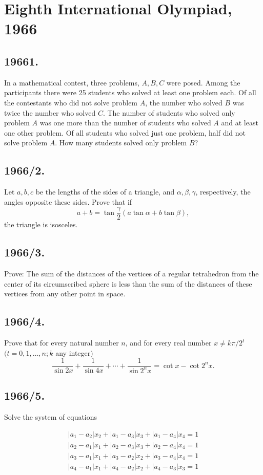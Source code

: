 \documentclass{article}
\begin{document}
\section*{Eighth International Olympiad, 1966}

\subsection*{19661.}
In a mathematical contest, three problems, $A, B, C$ were posed. Among the participants there were 25 students who solved at least one problem each. Of all the contestants who did not solve problem $A$, the number who solved $B$ was twice the number who solved $C$. The number of students who solved only problem $A$ was one more than the number of students who solved $A$ and at least one other problem. Of all students who solved just one problem, half did not solve problem $A$. How many students solved only problem $B$?

\subsection*{1966/2.}
Let $a, b, c$ be the lengths of the sides of a triangle, and $\alpha, \beta, \gamma$, respectively, the angles opposite these sides. Prove that if
$$
a + b = \tan \frac{\gamma}{2} (a \tan \alpha + b \tan \beta),
$$
the triangle is isosceles.

\subsection*{1966/3.}
Prove: The sum of the distances of the vertices of a regular tetrahedron from the center of its circumscribed sphere is less than the sum of the distances of these vertices from any other point in space.

\subsection*{1966/4.}
Prove that for every natural number $n$, and for every real number $x \neq k\pi/2^t$ $(t = 0, 1, \ldots, n; k$ any integer$)$
$$
\frac{1}{\sin 2x} + \frac{1}{\sin 4x} + \cdots + \frac{1}{\sin 2^n x} = \cot x - \cot 2^n x.
$$

\subsection*{1966/5.}
Solve the system of equations

\begin{align*}
|a_1 - a_2|x_2+|a_1 - a_3|x_3+|a_1 - a_4|x_4=1 \\
|a_2 - a_1|x_1+|a_2 - a_3|x_3+|a_2 - a_4|x_4=1 \\
|a_3 - a_1|x_1+|a_3 - a_2|x_2+|a_3 - a_4|x_4=1 \\
|a_4 - a_1|x_1+|a_4 - a_2|x_2+|a_4 - a_3|x_3=1
\end{align*}
\end{document}
